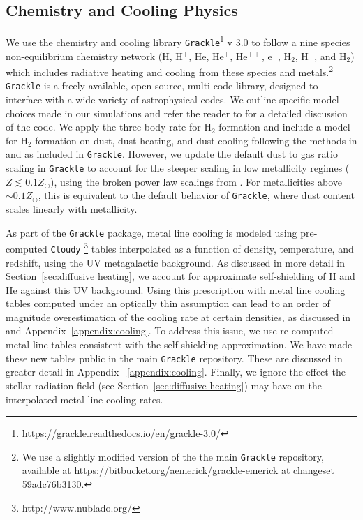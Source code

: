 \documentclass[twocolumn]{aastex61}
\begin{document}
\subsection{Chemistry and Cooling Physics}
\label{sec:chemistry}

We use the chemistry and cooling library \texttt{Grackle}\footnote{https://grackle.readthedocs.io/en/grackle-3.0/} v 3.0 to follow a nine species non-equilibrium chemistry network (H, H$^+$, He, He$^+$, He$^{++}$, e$^{-}$, H$_2$, H$^{-}$, and H$_{2}$) which includes radiative heating and cooling from these species and metals.\footnote{We use a slightly modified version of the the main \texttt{Grackle} repository, available at https://bitbucket.org/aemerick/grackle-emerick at changeset 59adc76b3130.} \texttt{Grackle} is a freely available, open source, multi-code library, designed to interface with a wide variety of astrophysical codes. We outline specific model choices made in our simulations and refer the reader to \citet{GrackleMethod} for a detailed discussion of the code. We apply the \citet{Glover2008} three-body rate for H$_{2}$ formation and include a model for H$_2$ formation on dust, dust heating, and dust cooling following the methods in \citet{2000ApJ...534..809O} and \citet{2005ApJ...626..627O} as included in \texttt{Grackle}. However, we update the default dust to gas ratio scaling in \texttt{Grackle} to account for the steeper scaling in low metallicity regimes ($Z \lesssim 0.1 Z_{\odot}$), using the broken power law scalings from \citet{Remy-Ruyer2014}. For metallicities above $\sim 0.1 Z_{\odot}$, this is equivalent to the default behavior of \texttt{Grackle}, where dust content scales linearly with metallicity.

As part of the \texttt{Grackle} package, metal line cooling is modeled using pre-computed \texttt{Cloudy} \citep{Cloudy2013} \footnote{http://www.nublado.org/} tables interpolated as a function of density, temperature, and redshift, using the \citet{HM2012} UV metagalactic background. As discussed in more detail in Section~\ref{sec:diffusive heating}, we account for approximate self-shielding of H and He against this UV background. Using this prescription with metal line cooling tables computed under an optically thin assumption can lead to an order of magnitude overestimation of the cooling rate at certain densities, as discussed in \citet{Hu2017} and  Appendix~\ref{appendix:cooling}. To address this issue, we use re-computed metal line tables consistent with the self-shielding approximation.  We have made these new tables public in the main \texttt{Grackle} repository. These are discussed in greater detail in Appendix ~\ref{appendix:cooling}. Finally, we ignore the effect the stellar radiation field (see Section~\ref{sec:diffusive heating}) may have on the interpolated metal line cooling rates. 
\end{document}
